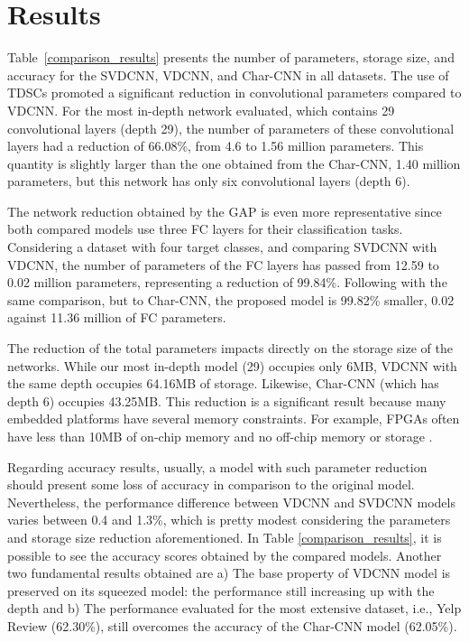 \documentclass[conference]{IEEEtran}
\begin{document}
\section{Results}

Table~\ref{comparison_results} presents the number of parameters, storage size, and accuracy for the SVDCNN, VDCNN, and Char-CNN in all datasets. The use of TDSCs promoted a significant reduction in convolutional parameters compared to VDCNN. For the most in-depth network evaluated, which contains 29 convolutional layers (depth 29), the number of parameters of these convolutional layers had a reduction of 66.08\%, from 4.6 to 1.56 million parameters. This quantity is slightly larger than the one obtained from the Char-CNN, 1.40 million parameters, but this network has only six convolutional layers (depth 6).

The network reduction obtained by the GAP is even more representative since both compared models use three FC layers for their classification tasks. Considering a dataset with four target classes, and comparing SVDCNN with VDCNN, the number of parameters of the FC layers has passed from 12.59 to 0.02 million parameters, representing a reduction of 99.84\%.  Following with the same comparison, but to Char-CNN, the proposed model is 99.82\% smaller, 0.02 against 11.36 million of FC parameters.

The reduction of the total parameters impacts directly on the storage size of the networks. While our most in-depth model (29) occupies only 6MB, VDCNN with the same depth occupies 64.16MB of storage. Likewise, Char-CNN (which has depth 6) occupies 43.25MB. This reduction is a significant result because many embedded platforms have several memory constraints. For example, FPGAs often have less than 10MB of on-chip memory and no off-chip memory or storage \cite{howard2017mobilenets}.

Regarding accuracy results, usually, a model with such parameter reduction should present some loss of accuracy in comparison to the original model. Nevertheless, the performance difference between VDCNN and SVDCNN models varies between 0.4 and 1.3\%, which is pretty modest considering the parameters and storage size reduction aforementioned. In Table \ref{comparison_results}, it is possible to see the accuracy scores obtained by the compared models. Another two fundamental results obtained are a) The base property of VDCNN model is preserved on its squeezed model: the performance still increasing up with the depth and b) The performance evaluated for the most extensive dataset, i.e., Yelp Review (62.30\%), still overcomes the accuracy of the Char-CNN model (62.05\%).
\end{document}
